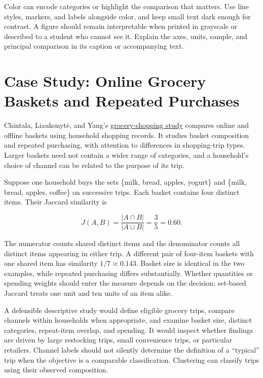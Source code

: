 Color can encode categories or highlight the comparison that matters.
Use line styles, markers, and labels alongside color, and keep small
text dark enough for contrast. A figure should remain interpretable when
printed in grayscale or described to a student who cannot see it.
Explain the axes, units, sample, and principal comparison in its caption
or accompanying text.

\hypertarget{M02-case-study-online-grocery-baskets-and-repeated-purchases}{%
\section{Case Study: Online Grocery Baskets and Repeated
Purchases}\label{M02-case-study-online-grocery-baskets-and-repeated-purchases}}

\noindent Chintala, Liaukonytė, and Yang's
\href{https://doi.org/10.1287/mksc.2022.0292}{grocery-shopping study}
compares online and offline baskets using household shopping records. It
studies basket composition and repeated purchasing, with attention to
differences in shopping-trip types. Larger baskets need not contain a
wider range of categories, and a household's choice of channel can be
related to the purpose of its trip.

Suppose one household buys the sets \{milk, bread, apples, yogurt\} and
\{milk, bread, apples, coffee\} on successive trips. Each basket
contains four distinct items. Their Jaccard similarity is

\[
J(A,B)=\frac{|A\cap B|}{|A\cup B|}=\frac{3}{5}=0.60.
\]

The numerator counts shared distinct items and the denominator counts
all distinct items appearing in either trip. A different pair of
four-item baskets with one shared item has similarity
\(1/7\approx0.143\). Basket size is identical in the two examples, while
repeated purchasing differs substantially. Whether quantities or
spending weights should enter the measure depends on the decision;
set-based Jaccard treats one unit and ten units of an item alike.

A defensible descriptive study would define eligible grocery trips,
compare channels within households when appropriate, and examine basket
size, distinct categories, repeat-item overlap, and spending. It would
inspect whether findings are driven by large restocking trips, small
convenience trips, or particular retailers. Channel labels should not
silently determine the definition of a ``typical'' trip when the
objective is a comparable classification. Clustering can classify trips
using their observed composition.


